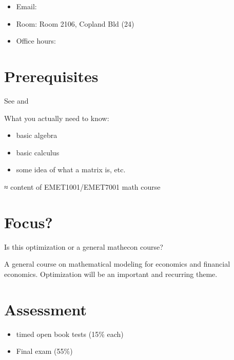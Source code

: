 \documentclass[letterpaper,10pt,english]{jupyterBook}
\begin{document}
\sphinxAtStartPar
{}
\begin{itemize}
\item {} 
\sphinxAtStartPar
Email: 

\item {} 
\sphinxAtStartPar
Room: Room 2106, Copland Bld (24)

\item {} 
\sphinxAtStartPar
Office hours: 

\end{itemize}


\chapter{Prerequisites}
\label{\detokenize{01.introduction:prerequisites}}
\sphinxAtStartPar
See  and

\sphinxAtStartPar
What you actually need to know:
\begin{itemize}
\item {} 
\sphinxAtStartPar
basic algebra

\item {} 
\sphinxAtStartPar
basic calculus

\item {} 
\sphinxAtStartPar
some idea of what a matrix is, etc.

\end{itemize}

\sphinxAtStartPar
≈ content of EMET1001/EMET7001 math course


\chapter{Focus?}
\label{\detokenize{01.introduction:focus}}
\sphinxAtStartPar
{} Is this optimization or a general math\sphinxhyphen{}econ course?

\sphinxAtStartPar
{} A general course on mathematical modeling for economics and financial economics. Optimization will be an important and recurring theme.


\chapter{Assessment}
\label{\detokenize{01.introduction:assessment}}\begin{itemize}
\item {} 
 timed open book tests (15\% each)

\item {} 
\sphinxAtStartPar
Final exam (55\%)

\end{itemize}
\end{document}
